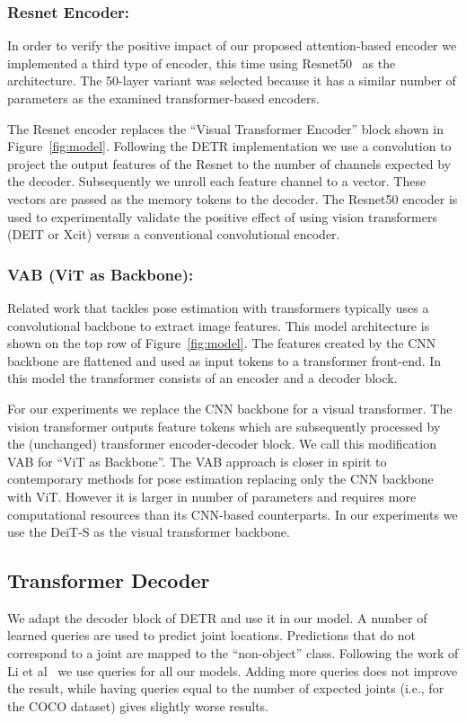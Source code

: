 \documentclass[runningheads]{llncs}
\begin{document}
\subsubsection{Resnet Encoder:}
In order to verify the positive impact of our proposed attention-based encoder
we implemented a third type of encoder, this time using Resnet50~\cite{he2016deep} 
as the architecture. The 50-layer variant was selected because it has a similar number 
of parameters as the examined transformer-based encoders.

The Resnet encoder replaces the ``Visual Transformer Encoder'' block 
shown in Figure~\ref{fig:model}. Following the DETR implementation we use a  convolution to project the output features of the Resnet to the number of channels expected by the decoder. Subsequently we unroll each feature channel to a vector. These vectors are
passed as the memory tokens to the decoder.
The Resnet50 encoder is used to experimentally validate the positive effect of 
using vision transformers (DEIT or Xcit) versus a conventional convolutional encoder. 

\subsubsection{VAB (ViT as Backbone):}
Related work that tackles pose estimation with transformers typically uses a convolutional backbone 
to extract image features. This model architecture is shown on the top row of Figure~\ref{fig:model}. The features created by the CNN backbone are flattened and used as input tokens to a transformer front-end. In this model the transformer consists of an encoder and a decoder block.

For our experiments we replace the CNN backbone for a visual transformer.
The vision transformer outputs feature tokens which are subsequently processed by the 
(unchanged) transformer encoder-decoder block. We call this modification VAB for ``ViT as Backbone''. 
The VAB approach is closer in spirit to contemporary methods for pose estimation 
replacing only the CNN backbone with ViT. However it is larger in number of parameters 
and requires more computational resources than its CNN-based counterparts.
In our experiments we use the DeiT-S as the visual transformer backbone.


\subsection{Transformer Decoder}
\label{sec:decoder}
We adapt the decoder block of DETR and use it in our model. A number of learned queries are used to predict joint locations. Predictions that do not correspond to a joint are mapped to the ``non-object'' class. Following the work of Li et al~\cite{li2021pose} we use  queries for all our models. Adding more queries does not improve the result, while having queries equal to the number of  expected joints (i.e.,  for the COCO dataset) gives slightly worse results.
\end{document}
